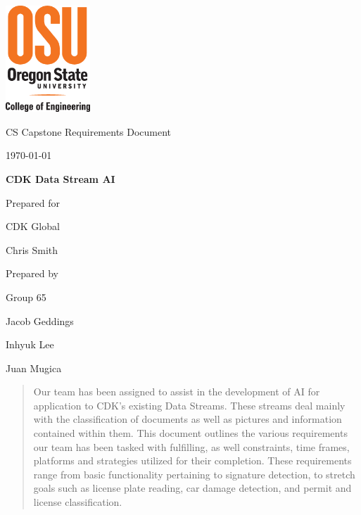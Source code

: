 \documentclass[onecolumn, draftclsnofoot,10pt, compsoc]{IEEEtran}
\def \CapstoneTeamName{		GROUP65}
\def \CapstoneTeamNumber{		65}
\def \GroupMemberOne{			Jacob Geddings}
\def \GroupMemberTwo{			Inhyuk Lee}
\def \GroupMemberThree{			Juan Mugica}
\def \CapstoneProjectName{		CDK Data Stream AI}
\def \CapstoneSponsorCompany{	CDK Global}
\def \CapstoneSponsorPerson{		Chris Smith}
\def \DocType{		%
				Requirements Document
				}
\begin{document}
\begin{titlepage}
    \begin{singlespace}
    	\includegraphics[height=4cm]{coe_v_spot1}
        \hfill 
        \par\vspace{.2in}
        \centering
        \scshape{
            \huge CS Capstone \DocType \par
            {\large\today}\par
            \vspace{.5in}
            \textbf{\Huge\CapstoneProjectName}\par
            \vfill
            {\large Prepared for}\par
            \Huge \CapstoneSponsorCompany\par
            \vspace{5pt}
            {\Large\CapstoneSponsorPerson\par}
            {\large Prepared by }\par
            Group\CapstoneTeamNumber\par
            \vspace{5pt}
            {\Large
                \GroupMemberOne\par
                \GroupMemberTwo\par
               \GroupMemberThree\par
            }
            \vspace{20pt}
        }
        \begin{abstract}
		Our team has been assigned to assist in the development of AI for application to CDK’s existing Data Streams.
		 These streams deal mainly with the classification of documents as well as pictures and information contained within them. 
		This document outlines the various requirements our team has been tasked with fulfilling, as well constraints, time frames, platforms and strategies utilized for their completion.
		These requirements range from basic functionality pertaining to signature detection, to stretch goals such as license plate reading, car damage detection, and permit and license classification.
		
        \end{abstract}     
    \end{singlespace}
\end{titlepage}
\end{document}
